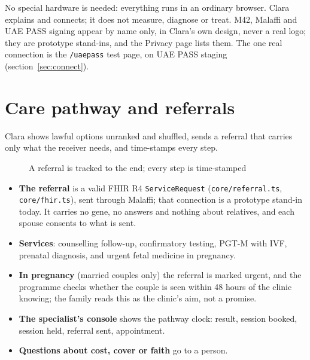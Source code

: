 \documentclass[10.5pt,a4paper]{article}
\newcommand{\chapterbreak}{}
\let\oldsection\section
\renewcommand{\section}{\chapterbreak\oldsection}
\newcommand{\code}[1]{\texttt{\small #1}}
\newcommand{\file}[1]{\leavevmode\textcolor{muted}{\texttt{\small #1}}}
\begin{document}
No special hardware is needed: everything runs in an ordinary browser. Clara explains and connects; it does not
measure, diagnose or treat. M42, Malaffi and UAE PASS signing appear by name only, in Clara's own design, never a real
logo; they are prototype stand-ins, and the Privacy page lists them. The one real connection is the \code{/uaepass} test page, on UAE PASS staging
\mbox{(section~\ref{sec:connect})}.

\section{Care pathway and referrals}

Clara shows lawful options unranked and shuffled, sends a referral that carries only what the receiver needs, and
time-stamps every step.

\begin{figure}[!htbp]
\centering
{}
\caption{A referral is tracked to the end; every step is time-stamped}
\end{figure}

\begin{itemize}
  \item \textbf{The referral} is a valid FHIR R4 \code{ServiceRequest} (\file{core/referral.ts}, \file{core/fhir.ts}),
        sent through Malaffi; that connection is a prototype stand-in today. It carries no gene, no answers and nothing about relatives, and each spouse consents to what
        is sent.
  \item \textbf{Services}: counselling follow-up, confirmatory testing, PGT-M with IVF, prenatal diagnosis, and urgent
        fetal medicine in pregnancy.
  \item \textbf{In pregnancy} (married couples only) the referral is marked urgent, and the programme checks whether the
        couple is seen within 48 hours of the clinic knowing; the family reads this as the clinic's aim, not a promise.
  \item \textbf{The specialist's console} shows the pathway clock: result, session booked, session held, referral
        sent, appointment.
  \item \textbf{Questions about cost, cover or faith} go to a person.
\end{itemize}
\end{document}
